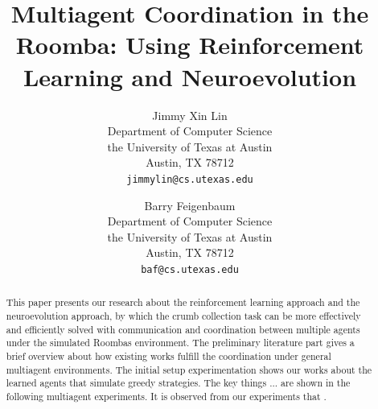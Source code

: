 \documentclass[conference]{IEEEtran}
\begin{document}
%
\title{Multiagent Coordination in the Roomba: Using
    Reinforcement Learning and Neuroevolution}



\author{ 
Jimmy Xin Lin \\
Department of Computer Science\\
the University of Texas at Austin\\
Austin, TX 78712 \\
\texttt{jimmylin@cs.utexas.edu} \\
\and
Barry Feigenbaum \\
Department of Computer Science\\
the University of Texas at Austin\\
Austin, TX 78712 \\
\texttt{baf@cs.utexas.edu} \\
}

\maketitle

\begin{abstract}
    This paper presents our research about the reinforcement learning approach
    and the neuroevolution approach, by which the crumb collection task can be
    more effectively and efficiently solved with communication and
    coordination between multiple agents under the simulated Roombas
    environment.
    The preliminary literature part gives a brief overview about how existing
    works fulfill the coordination under general multiagent environments.
    The initial setup experimentation shows our works about the
    learned agents that simulate greedy strategies.
    The key things ... are shown in the following multiagent experiments.
    It is observed from our experiments that .
\end{abstract}

\IEEEpeerreviewmaketitle
\end{document}
